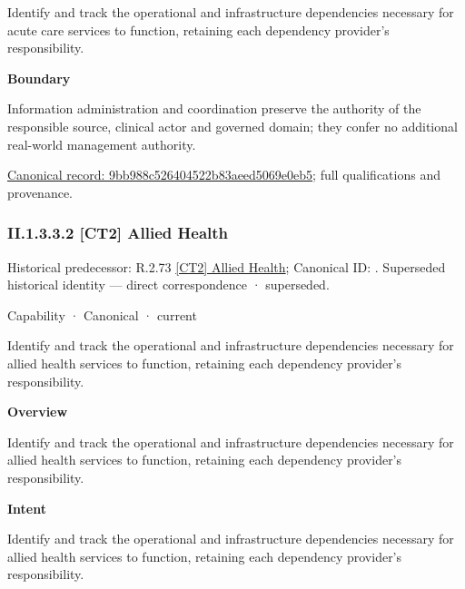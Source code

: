 Identify and track the operational and infrastructure dependencies necessary for acute care services to function, retaining each dependency provider's responsibility.



\textbf{Boundary}



Information administration and coordination preserve the authority of the responsible source, clinical actor and governed domain; they confer no additional real-world management authority.


{\footnotesize \href{../../../../../../../continuum/strategy/capability/9bb988c526404522b83aeed5069e0eb5.md}{Canonical record: 9bb988c526404522b83aeed5069e0eb5}; full qualifications and provenance.}\par
\subsubsection*{II.1.3.3.2 [CT2] Allied Health}
\label{navigation:II.1.3.3.2}

{\small Historical predecessor: R.2.73 \hyperref[element:6cd45c27d0c344b9807174dbd812d572]{[CT2] Allied Health}; Canonical ID: \texttt{}. Superseded historical identity — direct correspondence · superseded.}\par
\label{element:63cd714a3e2a4354aa5383b189fea566}
{\small Capability · Canonical · current}\par

Identify and track the operational and infrastructure dependencies necessary for allied health services to function, retaining each dependency provider's responsibility.



\textbf{Overview}



Identify and track the operational and infrastructure dependencies necessary for allied health services to function, retaining each dependency provider's responsibility.



\textbf{Intent}



Identify and track the operational and infrastructure dependencies necessary for allied health services to function, retaining each dependency provider's responsibility.



